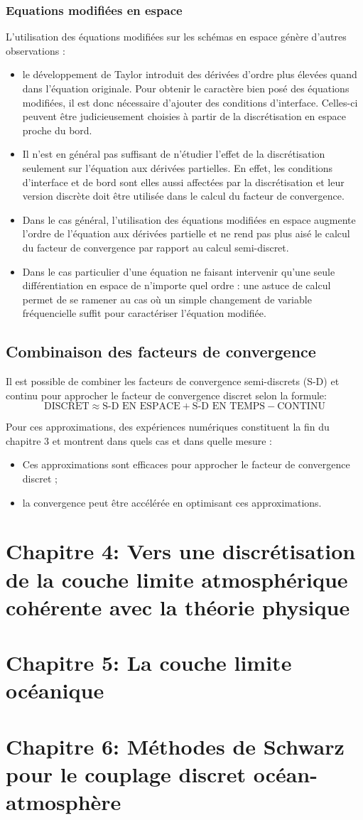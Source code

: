 \subsubsection*{Equations modifiées en espace}
L'utilisation des équations modifiées sur les schémas en espace
génère d'autres observations :
\begin{itemize}
	\item 
	le développement de Taylor introduit des dérivées
d'ordre plus élevées quand dans l'équation originale. Pour
obtenir le caractère bien posé des équations modifiées, il est donc
nécessaire d'ajouter des conditions d'interface. Celles-ci peuvent
être judicieusement choisies à partir de la discrétisation en espace
proche du bord.
	\item Il n'est en général pas suffisant de n'étudier
		l'effet de la discrétisation seulement sur
		l'équation aux dérivées partielles. En effet,
		les conditions d'interface et de bord sont
		elles aussi affectées par la discrétisation et
		leur version discrète doit être utilisée
		dans le calcul du facteur de convergence.
	\item Dans le cas général, l'utilisation des équations
	modifiées en espace augmente l'ordre de l'équation aux
	dérivées partielle et ne rend pas plus aisé
	le calcul du facteur de convergence par rapport
		au calcul semi-discret.
	\item Dans le cas particulier d'une équation ne faisant
	intervenir
	qu'une seule différentiation en espace de n'importe
	quel ordre :
	une astuce de calcul permet de se ramener au cas où un simple
	changement de variable fréquencielle suffit pour caractériser
		l'équation modifiée.
\end{itemize}
%
\subsection*{Combinaison des facteurs de convergence}
Il est possible de combiner les facteurs
de convergence semi-discrets (S-D) et continu pour approcher le
facteur de convergence discret selon la formule:
\begin{equation}
	\text{DISCRET} \approx
	\text{S-D EN ESPACE} +
	\text{S-D EN TEMPS} -
	\text{CONTINU}
\end{equation}
%
\par
Pour ces approximations, des expériences numériques constituent la fin
du chapitre 3 et montrent dans quels cas et dans quelle mesure :
\begin{itemize}
	\item
Ces approximations sont efficaces pour approcher le facteur
de convergence discret ;
	\item
la convergence
peut être accélérée en optimisant ces approximations.
\end{itemize}
\section*{Chapitre 4: Vers une discrétisation de la couche limite atmosphérique cohérente avec la théorie physique}
\section*{Chapitre 5: La couche limite océanique}
\section*{Chapitre 6: Méthodes de Schwarz pour le couplage
discret océan-atmosphère}
